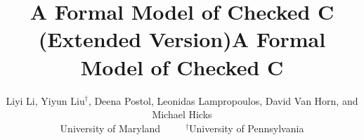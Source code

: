 \documentclass[conference]{IEEEtran}
\begin{document}
\iftr
\title{A Formal Model of Checked C {\large (Extended Version)}}
\else
\title{A Formal Model of Checked C}
\fi



\author{Liyi Li, Yiyun Liu$^\dagger$, Deena Postol, Leonidas
  Lampropoulos, David Van Horn, and Michael Hicks\\
  University of Maryland $\quad\quad ~^\dagger$University of Pennsylvania}
  


\maketitle
\end{document}
